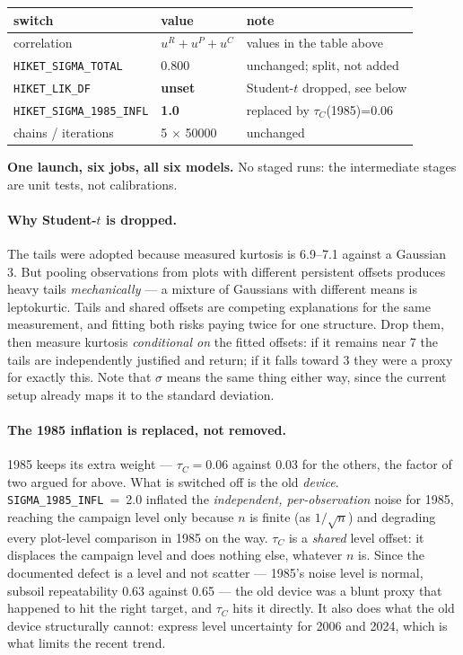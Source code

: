 \documentclass[11pt]{article}
\begin{document}
\begin{center}
\begin{tabular}{lll}
\toprule
switch & value & note \\
\midrule
correlation & $u^{R}+u^{P}+u^{C}$ & values in the table above \\
\texttt{HIKET\_SIGMA\_TOTAL} & 0.800 & unchanged; split, not added \\
\texttt{HIKET\_LIK\_DF} & \textbf{unset} & Student-$t$ dropped, see below \\
\texttt{HIKET\_SIGMA\_1985\_INFL} & \textbf{1.0} & replaced by $\tau_C$(1985)=0.06 \\
chains / iterations & 5 $\times$ 50000 & unchanged \\
\bottomrule
\end{tabular}
\end{center}

\textbf{One launch, six jobs, all six models.} No staged runs: the intermediate
stages are unit tests, not calibrations.

\paragraph{Why Student-$t$ is dropped.} The tails were adopted because measured
kurtosis is 6.9--7.1 against a Gaussian 3. But pooling observations from plots with
different persistent offsets produces heavy tails \emph{mechanically} --- a mixture
of Gaussians with different means is leptokurtic. Tails and shared offsets are
competing explanations for the same measurement, and fitting both risks paying twice
for one structure. Drop them, then measure kurtosis \emph{conditional on} the fitted
offsets: if it remains near 7 the tails are independently justified and return; if
it falls toward 3 they were a proxy for exactly this. Note that $\sigma$ means the
same thing either way, since the current setup already maps it to the standard
deviation.

\paragraph{The 1985 inflation is replaced, not removed.} 1985 keeps its extra
weight --- $\tau_C = 0.06$ against 0.03 for the others, the factor of two argued for
above. What is switched off is the old \emph{device}. \texttt{SIGMA\_1985\_INFL}~=~2.0
inflated the \emph{independent, per-observation} noise for 1985, reaching the campaign
level only because $n$ is finite (as $1/\sqrt{n}$) and degrading every plot-level
comparison in 1985 on the way. $\tau_C$ is a \emph{shared} level offset: it displaces
the campaign level and does nothing else, whatever $n$ is. Since the documented defect
is a level and not scatter --- 1985's noise level is normal, subsoil repeatability 0.63
against 0.65 --- the old device was a blunt proxy that happened to hit the right target,
and $\tau_C$ hits it directly. It also does what the old device structurally cannot:
express level uncertainty for 2006 and 2024, which is what limits the recent trend.
\end{document}
